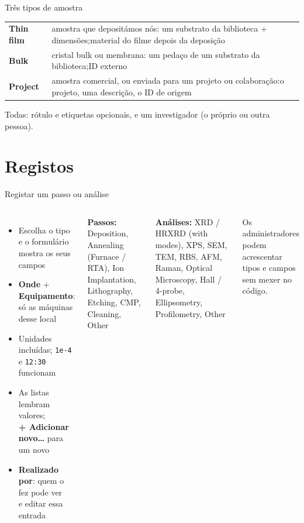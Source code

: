 \documentclass[aspectratio=169,11pt]{beamer}
\newcommand{\ui}[1]{\textsf{\textbf{#1}}}
\begin{document}
\begin{frame}{Três tipos de amostra}
  \centering
  \begin{tabular}{@{}l>{\raggedright\arraybackslash}p{9.5cm}@{}}
    \toprule
    \textbf{Thin film} & amostra que depositámos nós: um substrato da biblioteca + dimensões;\newline material do filme depois da deposição \\
    \textbf{Bulk}      & cristal bulk ou membrana: um pedaço de um substrato da biblioteca;\newline ID externo \\
    \textbf{Project}   & amostra comercial, ou enviada para um projeto ou colaboração:\newline o projeto, uma descrição, o ID de origem \\
    \bottomrule
  \end{tabular}

  \vspace{0.5cm}
  Todas: rótulo e etiquetas opcionais, e um investigador (o próprio ou outra pessoa).
\end{frame}

\section{Registos}
\begin{frame}{Registar um passo ou análise}
  \begin{columns}[T]
    \begin{itemize}
      \item Escolha o tipo e o formulário\\ mostra os seus campos
      \item \textbf{Onde} + \textbf{Equipamento}:\\ só as máquinas desse local
      \item Unidades incluídas; \texttt{1e-4} e \texttt{12:30} funcionam
      \item As listas lembram valores;\\ \ui{+ Adicionar novo\ldots} para um novo
      \item \textbf{Realizado por}: quem o fez pode ver\\ e editar essa entrada
    \end{itemize}
    \small
    \textbf{Passos:} Deposition, Annealing (Furnace / RTA), Ion
    Implantation, Lithography, Etching, CMP, Cleaning, Other

    \vspace{0.3cm}
    \textbf{Análises:} XRD / HRXRD (with modes), XPS, SEM, TEM, RBS, AFM,
    Raman, Optical Microscopy, Hall / 4-probe, Ellipsometry, Profilometry, Other

    \vspace{0.3cm}
    \footnotesize Os administradores podem acrescentar tipos e campos sem mexer no código.
  \end{columns}
\end{frame}
\end{document}
